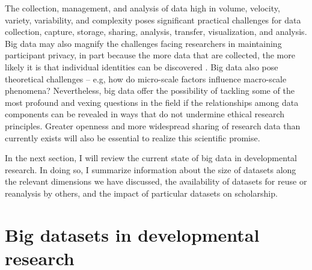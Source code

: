 \documentclass[letterpaper,man,apacite]{apa6}
\begin{document}
The collection, management, and analysis of data high in volume, velocity, variety, variability, and complexity poses significant practical challenges for data collection, capture, storage, sharing, analysis, transfer, visualization, and analysis.
Big data may also magnify the challenges facing researchers in maintaining participant privacy, in part because the more data that are collected, the more likely it is that individual identities can be discovered \cite{sweeney_identifiability}.
Big data also pose theoretical challenges -- e.g, how do micro-scale factors influence macro-scale phenomena?
Nevertheless, big data offer the possibility of tackling some of the most profound and vexing questions in the field if the relationships among data components can be revealed in ways that do not undermine ethical research principles.
Greater openness and more widespread sharing of research data than currently exists will also be essential to realize this scientific promise.

In the next section, I will review the current state of big data in developmental research.
In doing so, I summarize information about the size of datasets along the relevant dimensions we have discussed, the availability of datasets for reuse or reanalysis by others, and the impact of particular datasets on scholarship.

\section{Big datasets in developmental research}

\end{document}
